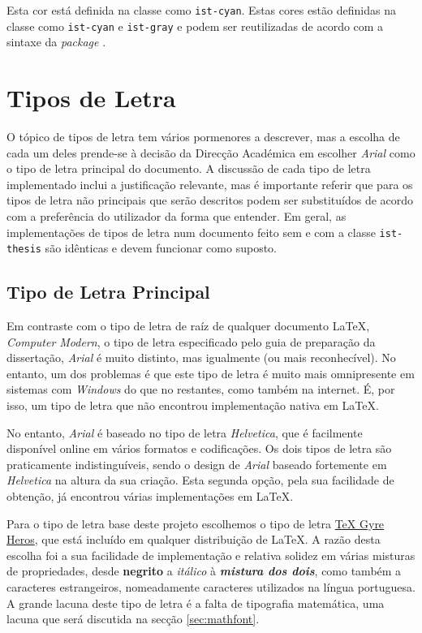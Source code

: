 \documentclass{../ist-thesis}
\begin{document}
Esta cor está definida na classe como \texttt{ist-cyan}.
Estas cores estão definidas na classe como \texttt{ist-cyan} e \texttt{ist-gray} e podem ser reutilizadas de acordo com a sintaxe da \textit{package} .

\section{Tipos de Letra}

O tópico de tipos de letra tem vários pormenores a descrever, mas a escolha de cada um deles prende-se à decisão da Direcção Académica em escolher \textit{Arial} como o tipo de letra principal do documento. A discussão de cada tipo de letra implementado inclui a justificação relevante, mas é importante referir que para os tipos de letra não principais que serão descritos podem ser substituídos de acordo com a preferência do utilizador da forma que entender. Em geral, as implementações de tipos de letra num documento feito sem e com a classe \texttt{ist-thesis} são idênticas e devem funcionar como suposto.

\subsection{Tipo de Letra Principal}

Em contraste com o tipo de letra de raíz de qualquer documento \LaTeX{}\footnotemark{}, \textit{Computer Modern}, o tipo de letra especificado pelo guia de preparação da dissertação, \textit{Arial} é muito distinto, mas igualmente (ou mais reconhecível). No entanto, um dos problemas é que este tipo de letra é muito mais omnipresente em sistemas com \textit{Windows} do que no restantes, como também na internet. É, por isso, um tipo de letra que não encontrou implementação nativa em \LaTeX{}.

No entanto, \textit{Arial} é baseado no tipo de letra \textit{Helvetica}, que é facilmente disponível online em vários formatos e codificações. Os dois tipos de letra são praticamente indistinguíveis, sendo o design de \textit{Arial} baseado fortemente em \textit{Helvetica} na altura da sua criação. Esta segunda opção, pela sua facilidade de obtenção, já encontrou várias implementações em \LaTeX{}.

Para o tipo de letra base deste projeto escolhemos o tipo de letra \href{https://ctan.org/pkg/tex-gyre-heros}{\TeX{} Gyre Heros}, que está incluído em qualquer distribuição de \LaTeX{}. A razão desta escolha foi a sua facilidade de implementação e relativa solidez em várias misturas de propriedades, desde \textbf{negrito} a \textit{itálico} à {\bfseries\itshape mistura dos dois}, como também a caracteres estrangeiros, nomeadamente caracteres utilizados na língua portuguesa. A grande lacuna deste tipo de letra é a falta de tipografia matemática, uma lacuna que será discutida na secção \ref{sec:mathfont}.
\end{document}
